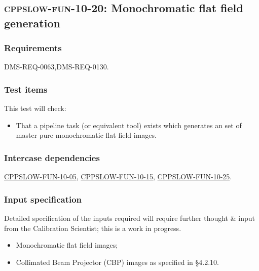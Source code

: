 \subsection{\textsc{cppslow-fun-10-20}: Monochromatic flat field generation}
\label{cppslow-fun-10-20}

\subsubsection{Requirements}

DMS-REQ-0063,DMS-REQ-0130.

\subsubsection{Test items}

This test will check:

\begin{itemize}

  \item{That a pipeline task (or equivalent tool) exists which generates an
  set of master pure monochromatic flat field images.}

\end{itemize}

\subsubsection{Intercase dependencies}

\hyperref[cppslow-fun-10-05]{CPPSLOW-FUN-10-05},
\hyperref[cppslow-fun-10-15]{CPPSLOW-FUN-10-15},
\hyperref[cppslow-fun-10-25]{CPPSLOW-FUN-10-25}.

\subsubsection{Input specification}

\begin{note}
Detailed specification of the inputs required will require further thought \&
input from the Calibration Scientist; this is a work in progress.
\end{note}

\begin{itemize}

  \item{Monochromatic flat field images;}
  \item{Collimated Beam Projector (CBP) images as specified in 
  \S4.2.10.}

\end{itemize}

